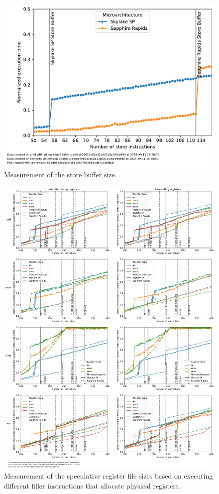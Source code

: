\begin{figure}[]
    \centering
    \includegraphics[width=0.8\columnwidth]{fig/robsize/store-buffer.pdf}
    \caption{\label{fig:robsize-store}Measurement of the store buffer size.}
\end{figure}
\begin{figure}[]
    \centering
    \includegraphics[width=\columnwidth]{fig/robsize/register-files.pdf}
    \caption{\label{fig:robsize-registers}Measurement of the speculative register file sizes based on executing different filler instructions that allocate physical registers.}
\end{figure}

